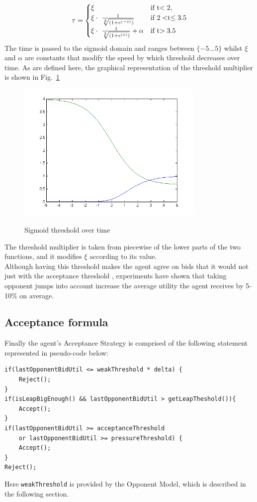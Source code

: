 \documentclass[html]{report}    %
\begin{document}
\begin{equation} \label{10}
	\tau =	\begin{cases}
	    	\xi & \mbox{if } $t$ < 2, \\
	   		\xi\cdot~\frac{1}{\sqrt[3]{(1+e^{(-x)})}} & \mbox{if }  2 < $t$ \leq 3.5\\
    	   	\xi\cdot~\frac{1}{\sqrt[3]{(1+e^{(x)})}}+ \alpha & \mbox{if }  $t$ > 3.5	   		
			\end{cases}
\end{equation}
The time is passed to the sigmoid domain and ranges between \textbf{$\{-5\dots5\}$} whilst $\xi$ and $\alpha$ are constants that modify the speed by which threshold decreases over time. As are defined here, the graphical representation of the threshold multiplier is shown in Fig.~\ref{sigmoid}
\begin{figure}[htbp]
  \caption{Sigmoid threshold over time}
  \centering
    \includegraphics[width=0.8\textwidth]{sigmoidfigure}
    \label{sigmoid}
\end{figure}
The threshold multiplier is taken from piecewise of the lower parts of the two functions, and it modifies $\xi$ according to its value. \\Although having this threshold makes the agent agree on bids that it would not just with the acceptance threshold , experiments have shown that taking opponent jumps into account increase the average utility the agent receives by 5-10$\%$ on average.

\subsection{Acceptance formula}
Finally the agent's Acceptance Strategy is comprised of the following statement represented in pseudo-code below:
\begin{verbatim}
if(lastOpponentBidUtil <= weakThreshold * delta) {
    Reject();
}
if(isLeapBigEnough() && lastOpponentBidUtil > getLeapTheshold()){
    Accept();
}
if(lastOpponentBidUtil >= acceptanceThreshold
    or lastOpponentBidUtil >= pressureThreshold) {
    Accept();
}
Reject();
\end{verbatim}
Here \texttt{weakThreshold} is provided by the Opponent Model, which is described in the following section.
\end{document}
